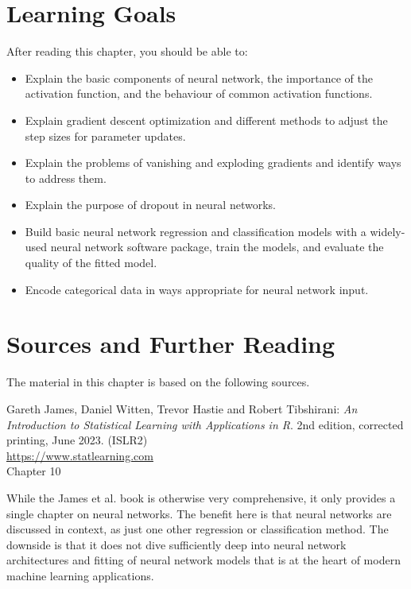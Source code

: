 %
%
\section*{Learning Goals}

After reading this chapter, you should be able to:
\begin{itemize}
   \item Explain the basic components of neural network, the importance of the activation function, and the behaviour of common activation functions.
   \item Explain gradient descent optimization and different methods to adjust the step sizes for parameter updates.
   \item Explain the problems of vanishing and exploding gradients and identify ways to address them.
   \item Explain the purpose of dropout in neural networks.
   \item Build basic neural network regression and classification models with a widely-used neural network software package, train the models, and evaluate the quality of the fitted model.
   \item Encode categorical data in ways appropriate for neural network input.
\end{itemize}


\section*{Sources and Further Reading}

The material in this chapter is based on the following sources. 

\begin{tcolorbox}[colback=alert]
Gareth James, Daniel Witten, Trevor Hastie and Robert Tibshirani: \emph{An Introduction to Statistical Learning with Applications in R}. 2nd edition, corrected printing, June 2023. (ISLR2) \\

\url{https://www.statlearning.com} \\

Chapter 10
\end{tcolorbox}

While the James et al. book is otherwise very comprehensive, it only provides a single chapter on neural networks. The benefit here is that neural networks are discussed in context, as just one other regression or classification method. The downside is that it does not dive sufficiently deep into neural network architectures and fitting of neural network models that is at the heart of modern machine learning applications.

